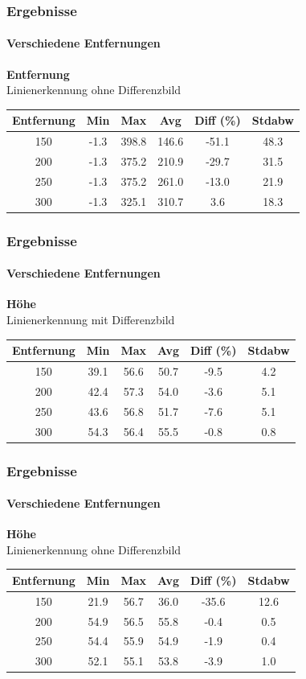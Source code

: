 \documentclass[xcolor=dvipsnames]{beamer}
\begin{document}
\begin{frame}
	\frametitle{Ergebnisse}
	\framesubtitle{Verschiedene Entfernungen}
		\textbf{Entfernung}\\
		
		Linienerkennung ohne Differenzbild
		\begin{tabular}{c|c|c|c|c|c}
			Entfernung & Min & Max & Avg & Diff (\%) & Stdabw\\ \hline
150 &      -1.3 & 398.8 & 146.6 & -51.1 & 48.3\\
200 &      -1.3 & 375.2 & 210.9 & -29.7 & 31.5\\
250 &      -1.3 & 375.2 & 261.0 & -13.0 & 21.9\\
300 &   -1.3 & 325.1 & 310.7 & 3.6 & 18.3\\
		\end{tabular}

\end{frame}



\begin{frame}
	\frametitle{Ergebnisse}
	\framesubtitle{Verschiedene Entfernungen}
		\textbf{Höhe}\\
		
		Linienerkennung mit Differenzbild
		\begin{tabular}{c|c|c|c|c|c}
			Entfernung & Min & Max & Avg & Diff (\%) & Stdabw\\ \hline
150 &     39.1 & 56.6 & 50.7 & -9.5 & 4.2\\
200 &     42.4 & 57.3 & 54.0 & -3.6 & 5.1\\
250 &     43.6 & 56.8 & 51.7 & -7.6 & 5.1\\
300 &  54.3 & 56.4 & 55.5 & -0.8 & 0.8\\


		\end{tabular}
\end{frame}


\begin{frame}
	\frametitle{Ergebnisse}
	\framesubtitle{Verschiedene Entfernungen}
		\textbf{Höhe}\\
		
		Linienerkennung ohne Differenzbild
		\begin{tabular}{c|c|c|c|c|c}
			Entfernung & Min & Max & Avg & Diff (\%) & Stdabw\\ \hline
150 &     21.9 & 56.7 & 36.0 & -35.6 & 12.6\\
200 &     54.9 & 56.5 & 55.8 & -0.4 & 0.5\\
250 &     54.4 & 55.9 & 54.9 & -1.9 & 0.4\\
300 &     52.1 & 55.1 & 53.8 & -3.9 & 1.0\\

		\end{tabular}
\end{frame}
\end{document}
